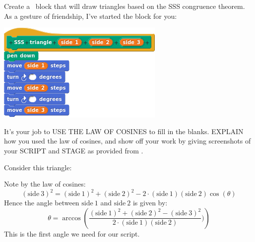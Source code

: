 \documentclass[noauthor,nooutcomes,12pt,handout]{ximera}
\begin{document}
\begin{question}
  Create a \snap\ block that will draw triangles based on the SSS
  congruence theorem.  As a gesture of friendship, I've started the
  block for you:
  \begin{center}
    \includegraphics{sssBlockBLANK}
  \end{center}
  It's your job to USE THE LAW OF COSINES to fill in the
  blanks. EXPLAIN how you used the law of cosines, and show off your
  work by giving screenshots of your SCRIPT and STAGE as provided
  from \snap.
  \begin{freeResponse}
    Consider this triangle:
    \begin{center}
      \end{center}


    
    Note by the law of cosines:
    \[
    (\mathrm{side~3})^2 = (\mathrm{side~1})^2 + (\mathrm{side~2})^2 - 2\cdot (\mathrm{side~1})(\mathrm{side~2})\cos(\theta)
    \]
    Hence the angle between $\mathrm{side~1}$ and $\mathrm{side~2}$ is given by:
    \[
    \theta = \arccos\left(\frac{(\mathrm{side~1})^2 + (\mathrm{side~2})^2- (\mathrm{side~3})^2}{2\cdot (\mathrm{side~1})(\mathrm{side~2})})\right) 
    \]
    This is the first angle we need for our script.


\end{freeResponse}
\end{question}
\end{document}
